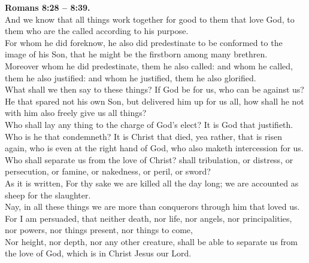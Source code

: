 \documentclass[10pt]{article} %
\begin{document}
{\begin{minipage}[t]{0.45\textwidth}
\textbf{Romans 8:28 -- 8:39.}\\
And we know that all things work together for good to them that love God, to them who are the called according to his purpose.\\
For whom he did foreknow, he also did predestinate to be conformed to the image of his Son, that he might be the firstborn among many brethren.\\
Moreover whom he did predestinate, them he also called: and whom he called, them he also justified: and whom he justified, them he also glorified.\\
What shall we then say to these things? If God be for us, who can be against us?\\
He that spared not his own Son, but delivered him up for us all, how shall he not with him also freely give us all things?\\
Who shall lay any thing to the charge of God's elect? It is God that justifieth.\\
Who is he that condemneth? It is Christ that died, yea rather, that is risen again, who is even at the right hand of God, who also maketh intercession for us.\\
Who shall separate us from the love of Christ? shall tribulation, or distress, or persecution, or famine, or nakedness, or peril, or sword?\\
As it is written, For thy sake we are killed all the day long; we are accounted as sheep for the slaughter.\\
Nay, in all these things we are more than conquerors through him that loved us.\\
For I am persuaded, that neither death, nor life, nor angels, nor principalities, nor powers, nor things present, nor things to come,\\
Nor height, nor depth, nor any other creature, shall be able to separate us from the love of God, which is in Christ Jesus our Lord.\\

\end{minipage}}
\vspace*{\fill}
\newpage
\huge%
\vspace*{\fill}
\end{document}
